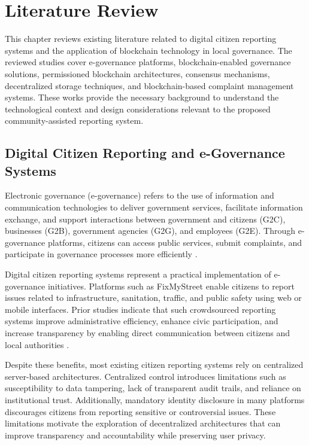 \chapter{Literature Review}

This chapter reviews existing literature related to digital citizen reporting systems and the application of blockchain technology in local governance. The reviewed studies cover e-governance platforms, blockchain-enabled governance solutions, permissioned blockchain architectures, consensus mechanisms, decentralized storage techniques, and blockchain-based complaint management systems. These works provide the necessary background to understand the technological context and design considerations relevant to the proposed community-assisted reporting system.

\section{Digital Citizen Reporting and e-Governance Systems}

Electronic governance (e-governance) refers to the use of information and communication technologies to deliver government services, facilitate information exchange, and support interactions between government and citizens (G2C), businesses (G2B), government agencies (G2G), and employees (G2E). Through e-governance platforms, citizens can access public services, submit complaints, and participate in governance processes more efficiently \cite{goyal2021egovernance}.

Digital citizen reporting systems represent a practical implementation of e-governance initiatives. Platforms such as FixMyStreet enable citizens to report issues related to infrastructure, sanitation, traffic, and public safety using web or mobile interfaces. Prior studies indicate that such crowdsourced reporting systems improve administrative efficiency, enhance civic participation, and increase transparency by enabling direct communication between citizens and local authorities \cite{oliveira2020smartcities}.

Despite these benefits, most existing citizen reporting systems rely on centralized server-based architectures. Centralized control introduces limitations such as susceptibility to data tampering, lack of transparent audit trails, and reliance on institutional trust. Additionally, mandatory identity disclosure in many platforms discourages citizens from reporting sensitive or controversial issues. These limitations motivate the exploration of decentralized architectures that can improve transparency and accountability while preserving user privacy.

